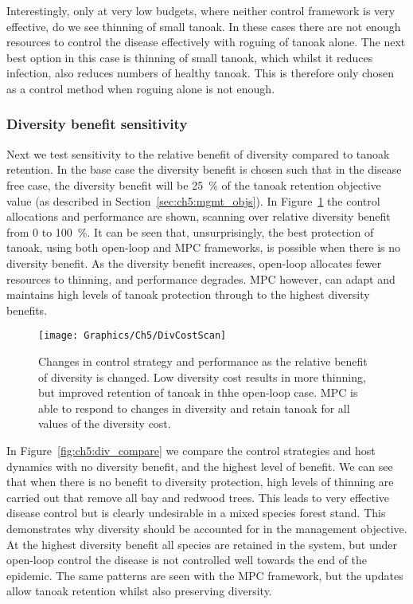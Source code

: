 Interestingly, only at very low budgets, where neither control framework is very effective, do we see thinning of small tanoak. In these cases there are not enough resources to control the disease effectively with roguing of tanoak alone. The next best option in this case is thinning of small tanoak, which whilst it reduces infection, also reduces numbers of healthy tanoak. This is therefore only chosen as a control method when roguing alone is not enough.

\subsubsection{Diversity benefit sensitivity}\label{sec:ch5:div_scan}

Next we test sensitivity to the relative benefit of diversity compared to tanoak retention. In the base case the diversity benefit is chosen such that in the disease free case, the diversity benefit will be \SI{25}{\percent} of the tanoak retention objective value (as described in Section~\ref{sec:ch5:mgmt_objs}). In Figure~\ref{fig:ch5:div_scan} the control allocations and performance are shown, scanning over relative diversity benefit from 0 to \SI{100}{\percent}. It can be seen that, unsurprisingly, the best protection of tanoak, using both open-loop and MPC frameworks, is possible when there is no diversity benefit. As the diversity benefit increases, open-loop allocates fewer resources to thinning, and performance degrades. MPC however, can adapt and maintains high levels of tanoak protection through to the highest diversity benefits.

\begin{figure}
    \begin{center}
        \texttt{[image: Graphics/Ch5/DivCostScan]}
        \caption[Varying the diversity cost]{Changes in control strategy and performance as the relative benefit of diversity is changed. Low diversity cost results in more thinning, but improved retention of tanoak in thhe open-loop case. MPC is able to respond to changes in diversity and retain tanoak for all values of the diversity cost. \label{fig:ch5:div_scan}}
    \end{center}
\end{figure}

In Figure~\ref{fig:ch5:div_compare} we compare the control strategies and host dynamics with no diversity benefit, and the highest level of benefit. We can see that when there is no benefit to diversity protection, high levels of thinning are carried out that remove all bay and redwood trees. This leads to very effective disease control but is clearly undesirable in a mixed species forest stand. This demonstrates why diversity should be accounted for in the management objective. At the highest diversity benefit all species are retained in the system, but under open-loop control the disease is not controlled well towards the end of the epidemic. The same patterns are seen with the MPC framework, but the updates allow tanoak retention whilst also preserving diversity.

